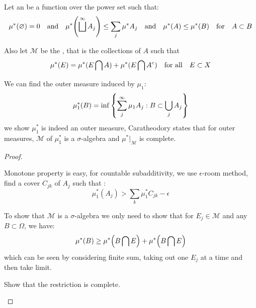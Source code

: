 Let an  be a function over the power set such that:
\begin{equation*}
    \mu^{*}(\emptyset)= 0 \qq{and} \mu^{*}\pqty{\sqcup^{\infty} A_{j}}\leq \sum_{j} \mu^{*} A_{j} \qq{and} \mu^{*}(A) \leq \mu^{*}(B)  \qq{for} A \subset B
\end{equation*}

Also let \(\mathcal{M}\) be the , that is the collections of \(A\) such that 
\begin{equation*}
    \mu^{*} (E) = \mu^{*}(E\cap A) + \mu^{*} (E\cap A^{c}) \qq{for all} E \subset X
\end{equation*}

\begin{thm}
    We can find the outer measure induced by \(\mu_{1}\): 
    \begin{equation*}
        \mu^{*}_{1}(B) = \inf\Bqty{\sum^{\infty}_{j} \mu_{1} A_{j}: B \subset \cup_{j}A_{j}}
    \end{equation*}
    we show \(\mu^{*}_{1}\) is indeed an outer measure, Caratheodory states that for outer measures, \(\mathcal{M}\) of \(\mu^{*}_{1}\) is a \(\sigma\)-algebra and \(\mu^{*}|_{\mathcal{M}}\) is complete. 
\end{thm}
\begin{proof}
    \begin{summary}[1]
        Monotone property is easy, for countable subadditivity, we use \(\epsilon\)-room method, find a cover \(C_{jk}\) of \(A_{j}\) such that :
        \begin{equation*}
            \mu^{*}_{1}(A_{j}) > \sum_{k} \mu^{*}_{1}C_{jk} - \epsilon
        \end{equation*}
    \end{summary}
    \begin{summary}[2]
        To show that \(\mathcal{M}\) is a \(\sigma\)-algebra we only need to show that for \(E_{j} \in \mathcal{M}\) and any \(B \subset \Omega\), we have:
        \begin{equation*}
            \mu^{*} (B ) \geq \mu^{*} \pqty{B \cap E} + \mu^{*} \pqty{B \cap E}
        \end{equation*}
        which can be seen by considering finite sum, taking out one \(E_{j}\) at a time and then take limit. 
    \end{summary}
    \begin{summary}[3]
        Show that the restriction is complete.
    \end{summary}
\end{proof}


